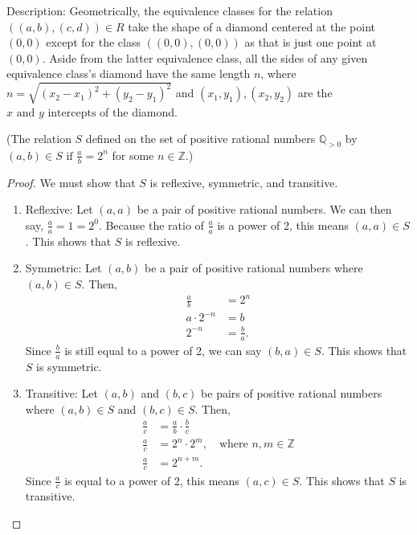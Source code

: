 \documentclass[11pt]{article}
\renewcommand\part[1]{\vspace{.10in}(#1)\par}
\newcommand{\Z}{\mathbb{Z}}
\newcommand{\Q}{\mathbb{Q}}
\begin{document}
Description: Geometrically, the equivalence classes for the relation $((a,b),(c,d)) \in R$ take the shape of a diamond centered at the point $(0,0)$ except for the class $((0,0),(0,0))$ as that is just one point at $(0,0)$. Aside from the latter equivalence class, all the sides of any given equivalence class's diamond have the same length $n$, where $n = \sqrt{(x_2 - x_1)^2 + (y_2 - y_1)^2}$ and $(x_1,y_1), (x_2,y_2)$ are the $x \text{ and } y \text{ intercepts}$ of the diamond.

\part{The relation $S$ defined on the set of positive rational numbers $\Q_{>0}$ by $(a,b) \in S \text{ if } \frac{a}{b}= 2^n$ for some $n \in \Z$.}

\begin{proof}
	We must show that $S$ is reflexive, symmetric, and transitive.
	\begin{enumerate}
		\item Reflexive: Let $(a,a)$ be a pair of positive rational numbers. We can then say, $\frac{a}{a} = 1 = 2^0$. Because the ratio of $\frac{a}{a}$ is a power of 2, this means $(a,a) \in S$. This shows that $S$ is reflexive.

		\item Symmetric: Let $(a,b)$ be a pair of positive rational numbers where $(a,b) \in S$. Then,
			\begin{align*}
				\frac{a}{b} &= 2^n\\
				a \cdot 2^{-n} &= b\\
				2^{-n} &= \frac{b}{a}.
			\end{align*}
			Since $\frac{b}{a}$ is still equal to a power of 2, we can say $(b,a) \in S$. This shows that $S$ is symmetric.

		\item Transitive: Let $(a,b)$ and $(b,c)$ be pairs of positive rational numbers where $(a,b) \in S$ and $(b,c) \in S$. Then,
			\begin{align*}
				\frac{a}{c} &= \frac{a}{b} \cdot \frac{b}{c}\\
				\frac{a}{c} &= 2^n \cdot 2^m, \quad \text{where $n,m \in \Z$}\\
				\frac{a}{c} &= 2^{n+m}.
			\end{align*}
			Since $\frac{a}{c}$ is equal to a power of 2, this means $(a,c) \in S$. This shows that $S$ is transitive.
	\end{enumerate}
\end{proof}
\end{document}
